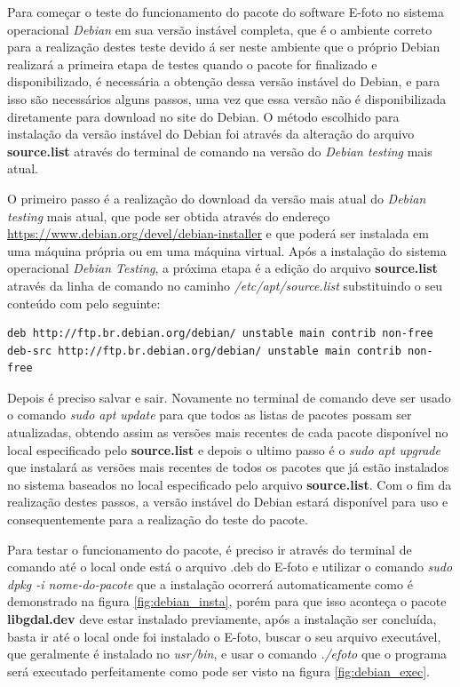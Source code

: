 Para começar o teste do funcionamento do pacote do software E-foto no sistema operacional \textit{Debian} em sua versão instável completa, que é o ambiente correto para a realização destes teste devido á ser neste ambiente que o próprio Debian realizará a primeira etapa de testes quando o pacote for finalizado e disponibilizado, é necessária a obtenção dessa versão instável do Debian, e para isso são necessários alguns passos, uma vez que essa versão não é disponibilizada diretamente para download no site do Debian. O método escolhido para instalação da versão instável do Debian foi através da alteração do arquivo \textbf{source.list} através do terminal de comando na versão do \textit{Debian testing} mais atual. 

O primeiro passo é a realização do download da versão mais atual do \textit{Debian testing} mais atual, que pode ser obtida através do endereço \url{https://www.debian.org/devel/debian-installer} e que poderá ser instalada em uma máquina própria ou em uma máquina virtual. Após a instalação do sistema operacional \textit{Debian Testing}, a próxima etapa é a edição do arquivo \textbf{source.list} através da linha de comando no caminho \textit{/etc/apt/source.list} substituindo o seu conteúdo com pelo seguinte:

 \begin{verbatim}
deb http://ftp.br.debian.org/debian/ unstable main contrib non-free	
deb-src http://ftp.br.debian.org/debian/ unstable main contrib non-free
\end{verbatim}

Depois é preciso salvar e sair. Novamente no terminal de comando deve ser usado o comando \textit{sudo apt update} para que todos as listas de pacotes possam ser atualizadas, obtendo assim as versões mais recentes de cada pacote disponível no local especificado pelo \textbf{source.list} e depois o ultimo passo é o \textit{sudo apt upgrade} que instalará as versões mais recentes de todos os pacotes que já estão instalados no sistema baseados no local especificado pelo arquivo \textbf{source.list}. Com o fim da realização destes passos, a versão instável do Debian estará disponível para uso e consequentemente para a realização do teste do pacote.

Para testar o funcionamento do pacote, é preciso ir através do terminal de comando até o local onde está o arquivo .deb do E-foto e utilizar o comando \textit{sudo dpkg -i nome-do-pacote} que a instalação ocorrerá automaticamente como é demonstrado na figura \ref{fig:debian_insta}, porém para que isso aconteça o pacote \textbf{libgdal.dev} deve estar instalado previamente, após a instalação ser concluída, basta ir até o local onde foi instalado o E-foto, buscar o seu arquivo executável, que geralmente é instalado no \textit{usr/bin}, e usar o comando \textit{./efoto} que o programa será executado perfeitamente como pode ser visto na figura \ref{fig:debian_exec}.

